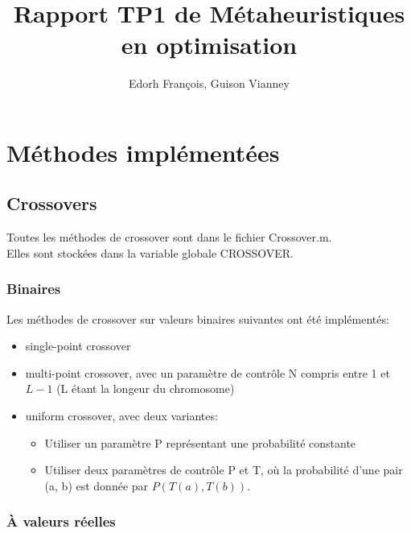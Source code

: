 \documentclass[12pt, letterpaper]{article}
\author{Edorh François, Guison Vianney}
\title{Rapport TP1 de Métaheuristiques en optimisation}
\begin{document}
\maketitle
\tableofcontents
\newpage

\section{Méthodes implémentées}

\subsection{Crossovers}

Toutes les méthodes de crossover sont dans le fichier Crossover.m.\\
Elles sont stockées dans la variable globale CROSSOVER.

\subsubsection{Binaires}

Les méthodes de crossover sur valeurs binaires suivantes ont été implémentés:
\begin{itemize}
\item single-point crossover\\
  
\item multi-point crossover, avec un paramètre de contrôle N compris
entre 1 et $L - 1$ (L étant la longeur du chromosome)\\
  
\item uniform crossover, avec deux variantes:
  \begin{itemize}
  \item Utiliser un paramètre P représentant une probabilité constante\\
    
  \item Utiliser deux paramètres de contrôle P et T, où la probabilité
    d'une pair (a, b) est donnée par $P(T(a), T(b))$.\\
    
  \end{itemize}
\end{itemize}

\subsubsection{À valeurs réelles}
\end{document}
